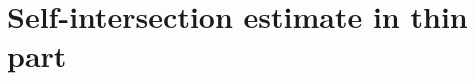 \documentclass[11pt, a4paper]{article}
\newtheorem{lemma}[thm]{Lemma}
\theoremstyle{definition}
\theoremstyle{remark}
\newcommand{\bbh}{\mathbb{H}}
\newcommand{\calx}{\mathcal{X}}
\newcommand{\caly}{\mathcal{Y}}
\newcommand{\bracket}[1]{\left( #1 \right)}
\begin{document}
\section{Self-intersection estimate in thin part}\label{section4}

\end{document}
